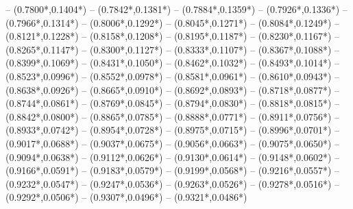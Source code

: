 {	-- ({0.7800*\dx},{0.1404*\dy})
	-- ({0.7842*\dx},{0.1381*\dy})
	-- ({0.7884*\dx},{0.1359*\dy})
	-- ({0.7926*\dx},{0.1336*\dy})
	-- ({0.7966*\dx},{0.1314*\dy})
	-- ({0.8006*\dx},{0.1292*\dy})
	-- ({0.8045*\dx},{0.1271*\dy})
	-- ({0.8084*\dx},{0.1249*\dy})
	-- ({0.8121*\dx},{0.1228*\dy})
	-- ({0.8158*\dx},{0.1208*\dy})
	-- ({0.8195*\dx},{0.1187*\dy})
	-- ({0.8230*\dx},{0.1167*\dy})
	-- ({0.8265*\dx},{0.1147*\dy})
	-- ({0.8300*\dx},{0.1127*\dy})
	-- ({0.8333*\dx},{0.1107*\dy})
	-- ({0.8367*\dx},{0.1088*\dy})
	-- ({0.8399*\dx},{0.1069*\dy})
	-- ({0.8431*\dx},{0.1050*\dy})
	-- ({0.8462*\dx},{0.1032*\dy})
	-- ({0.8493*\dx},{0.1014*\dy})
	-- ({0.8523*\dx},{0.0996*\dy})
	-- ({0.8552*\dx},{0.0978*\dy})
	-- ({0.8581*\dx},{0.0961*\dy})
	-- ({0.8610*\dx},{0.0943*\dy})
	-- ({0.8638*\dx},{0.0926*\dy})
	-- ({0.8665*\dx},{0.0910*\dy})
	-- ({0.8692*\dx},{0.0893*\dy})
	-- ({0.8718*\dx},{0.0877*\dy})
	-- ({0.8744*\dx},{0.0861*\dy})
	-- ({0.8769*\dx},{0.0845*\dy})
	-- ({0.8794*\dx},{0.0830*\dy})
	-- ({0.8818*\dx},{0.0815*\dy})
	-- ({0.8842*\dx},{0.0800*\dy})
	-- ({0.8865*\dx},{0.0785*\dy})
	-- ({0.8888*\dx},{0.0771*\dy})
	-- ({0.8911*\dx},{0.0756*\dy})
	-- ({0.8933*\dx},{0.0742*\dy})
	-- ({0.8954*\dx},{0.0728*\dy})
	-- ({0.8975*\dx},{0.0715*\dy})
	-- ({0.8996*\dx},{0.0701*\dy})
	-- ({0.9017*\dx},{0.0688*\dy})
	-- ({0.9037*\dx},{0.0675*\dy})
	-- ({0.9056*\dx},{0.0663*\dy})
	-- ({0.9075*\dx},{0.0650*\dy})
	-- ({0.9094*\dx},{0.0638*\dy})
	-- ({0.9112*\dx},{0.0626*\dy})
	-- ({0.9130*\dx},{0.0614*\dy})
	-- ({0.9148*\dx},{0.0602*\dy})
	-- ({0.9166*\dx},{0.0591*\dy})
	-- ({0.9183*\dx},{0.0579*\dy})
	-- ({0.9199*\dx},{0.0568*\dy})
	-- ({0.9216*\dx},{0.0557*\dy})
	-- ({0.9232*\dx},{0.0547*\dy})
	-- ({0.9247*\dx},{0.0536*\dy})
	-- ({0.9263*\dx},{0.0526*\dy})
	-- ({0.9278*\dx},{0.0516*\dy})
	-- ({0.9292*\dx},{0.0506*\dy})
	-- ({0.9307*\dx},{0.0496*\dy})
	-- ({0.9321*\dx},{0.0486*\dy})
}
